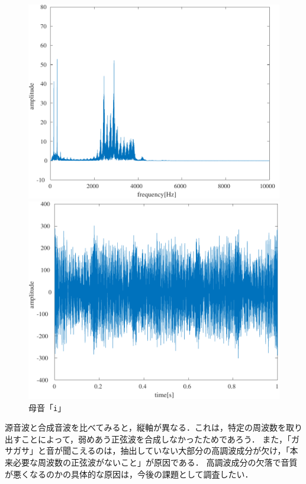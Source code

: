 \begin{figure}[H]
\begin{minipage}{.3\textwidth}
        \includegraphics[keepaspectratio,width=\textwidth]{../../Figures/03_31_ifft.pdf}
    \end{minipage}
    \begin{minipage}{.3\textwidth}
        \centering
        \includegraphics[keepaspectratio,width=\textwidth]{../../Figures/03_33_i.pdf}
    \end{minipage}
    \caption{母音「\texttt{i}」}
    \label{fig:合成音声_i}
\end{figure}
\consideration
源音波と合成音波を比べてみると，縦軸が異なる．これは，特定の周波数を取り出すことによって，弱めあう正弦波を合成しなかったためであろう．
また，「ガサガサ」と音が聞こえるのは，抽出していない大部分の高調波成分が欠け，「本来必要な周波数の正弦波がないこと」が原因である．
高調波成分の欠落で音質が悪くなるのかの具体的な原因は，今後の課題として調査したい．
